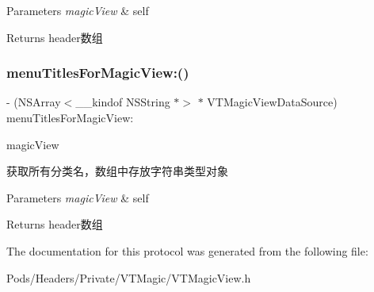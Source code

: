 \begin{DoxyParams}{Parameters}
{\em magic\+View} & self\\
\hline
\end{DoxyParams}
\begin{DoxyReturn}{Returns}
header数组 
\end{DoxyReturn}
\mbox{\label{protocol_v_t_magic_view_data_source_01-p_ad8d45d2488d12e71905c23e1fa908cff}} 
\subsubsection{\texorpdfstring{menu\+Titles\+For\+Magic\+View\+:()}{menuTitlesForMagicView:()}\hspace{0.1cm}{\footnotesize\ttfamily [3/3]}}
{\footnotesize\ttfamily -\/ (N\+S\+Array$<$\+\_\+\+\_\+kindof N\+S\+String $\ast$$>$ $\ast$ V\+T\+Magic\+View\+Data\+Source) menu\+Titles\+For\+Magic\+View\+: \begin{DoxyParamCaption}\item[{(\mbox{\hyperlink{interface_v_t_magic_view}{V\+T\+Magic\+View}} $\ast$)}]{magic\+View }\end{DoxyParamCaption}}

获取所有分类名，数组中存放字符串类型对象


\begin{DoxyParams}{Parameters}
{\em magic\+View} & self\\
\hline
\end{DoxyParams}
\begin{DoxyReturn}{Returns}
header数组 
\end{DoxyReturn}


The documentation for this protocol was generated from the following file\+:\begin{DoxyCompactItemize}
\item 
Pods/\+Headers/\+Private/\+V\+T\+Magic/V\+T\+Magic\+View.\+h\end{DoxyCompactItemize}
